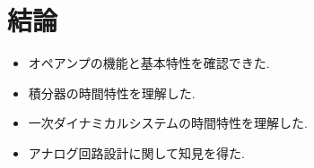 \section{結論}
\begin{itemize}
  \item オペアンプの機能と基本特性を確認できた.
  \item 積分器の時間特性を理解した.
  \item 一次ダイナミカルシステムの時間特性を理解した.
  \item アナログ回路設計に関して知見を得た.
\end{itemize}